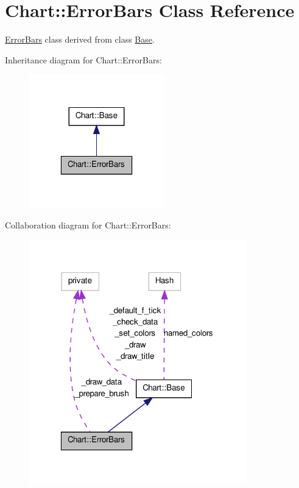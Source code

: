 \hypertarget{classChart_1_1ErrorBars}{
\section{Chart::ErrorBars Class Reference}
\label{classChart_1_1ErrorBars}
}


\hyperlink{classChart_1_1ErrorBars}{ErrorBars} class derived from class \hyperlink{classChart_1_1Base}{Base}.  




Inheritance diagram for Chart::ErrorBars:\nopagebreak
\begin{figure}[H]
\begin{center}
\leavevmode
\includegraphics[width=166pt]{classChart_1_1ErrorBars__inherit__graph}
\end{center}
\end{figure}


Collaboration diagram for Chart::ErrorBars:\nopagebreak
\begin{figure}[H]
\begin{center}
\leavevmode
\includegraphics[width=267pt]{classChart_1_1ErrorBars__coll__graph}
\end{center}
\end{figure}
